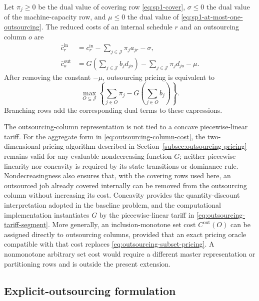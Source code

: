 Let $\pi_j\ge0$ be the dual value of covering row
\eqref{eq:sp1-cover}, $\sigma\le0$ the dual value of the machine-capacity row, and
$\mu\le0$ the dual value of
\eqref{eq:sp1-at-most-one-outsourcing}. The reduced costs of an internal schedule
$r$ and an outsourcing column $o$ are
\begin{align}
    \bar c_r^{\mathrm{in}}
    &=
    c_r^{\mathrm{in}}
    -\sum_{j\in\mathcal J}\pi_j a_{jr}
    -\sigma,
    \label{eq:internal-reduced-cost}\\
    \bar c_o^{\mathrm{out}}
    &=
    G\left(\sum_{j\in\mathcal J}b_jd_{jo}\right)
    -\sum_{j\in\mathcal J}\pi_jd_{jo}
    -\mu.
    \label{eq:outsourcing-reduced-cost}
\end{align}
After removing the constant $-\mu$, outsourcing pricing is equivalent to
\begin{equation}
    \max_{O\subseteq\mathcal J}
    \left\{
        \sum_{j\in O}\pi_j
        -
        G\left(\sum_{j\in O}b_j\right)
    \right\}.
    \label{eq:outsourcing-subset-pricing}
\end{equation}
Branching rows add the corresponding dual terms to these expressions.

The outsourcing-column representation is not tied to a concave piecewise-linear
tariff. For the aggregate form in \eqref{eq:outsourcing-column-cost}, the
two-dimensional pricing algorithm described in
Section~\ref{subsec:outsourcing-pricing} remains valid for any evaluable
nondecreasing function $G$; neither piecewise linearity nor concavity is required
by its state transitions or dominance rule. Nondecreasingness also ensures that,
with the covering rows used here, an outsourced job already covered internally can
be removed from the outsourcing column without increasing its cost. Concavity
provides the quantity-discount interpretation adopted in the baseline problem,
and the computational implementation instantiates $G$ by the piecewise-linear
tariff in \eqref{eq:outsourcing-tariff-segment}. More generally, an
inclusion-monotone set cost $C^{\mathrm{out}}(O)$ can be assigned directly to
outsourcing columns, provided that an exact pricing oracle compatible with that
cost replaces \eqref{eq:outsourcing-subset-pricing}. A nonmonotone arbitrary set
cost would require a different master representation or partitioning rows and is
outside the present extension.

\subsection{Explicit-outsourcing formulation}
\label{subsec:sp2}

